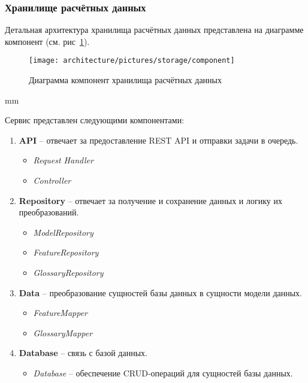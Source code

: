 \subsubsection{\large{Хранилище расчётных данных}}

Детальная архитектура хранилища расчётных данных представлена на диаграмме компонент
(см. рис\ \ref{pic:architecture__storage-component}).

\begin{figure}[H]
	\hspace*{-2.5 cm}\texttt{[image: architecture/pictures/storage/component]}
	\caption{Диаграмма компонент хранилища расчётных данных}
	\label{pic:architecture__storage-component}
\end{figure}
 mm


Сервис представлен следующими компонентами:
\begin{enumerate}
	\item {
		\textbf{API} -- отвечает за предоставление REST API и отправки задачи в очередь.
		\begin{itemize}
			\item \textit{Request Handler}
			\item \textit{Controller}
		\end{itemize}
	}
	\item {
		\textbf{Repository} -- отвечает за получение и сохранение данных и логику их преобразований.
		\begin{itemize}
			\item \textit{ModelRepository}
			\item \textit{FeatureRepository}
			\item \textit{GlossaryRepository}
		\end{itemize}
	}
	\item {
		\textbf{Data} -- преобразование сущностей базы данных в сущности модели данных.
		\begin{itemize}
			\item \textit{FeatureMapper}
			\item \textit{GlossaryMapper}
		\end{itemize}
	}
	\item {
		\textbf{Database} -- связь с базой данных.
		\begin{itemize}
			\item \textit{Database} -- обеспечение CRUD-операций для сущностей базы данных.
		\end{itemize}
	}
\end{enumerate}
